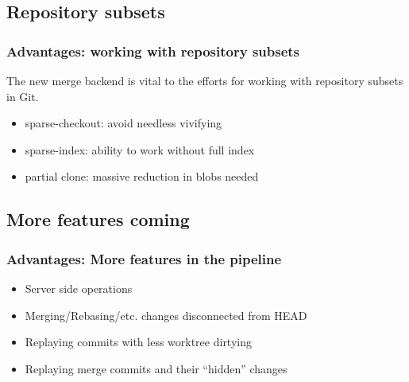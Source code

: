 \documentclass[compress,t]{beamer}
\begin{document}
\begin{frame}[fragile]
\begin{comment}
  Due to the new merge strategy, the fourth now has an answer too:
  \begin{enumerate}[4]
    \item \texttt{git diff AUTO\_MERGE}
  \end{enumerate}
  \end{comment}

\end{frame}

\subsection[subsetting]{Repository subsets}

\begin{frame}
  \frametitle{Advantages: working with repository subsets}

  The new merge backend is vital to the efforts for working with
  repository subsets in Git.
  \begin{itemize}
    \item sparse-checkout: avoid needless vivifying
    \item sparse-index: ability to work without full index
    \item partial clone: massive reduction in blobs needed
  \end{itemize}

\end{frame}

\subsection[...]{More features coming}

\begin{frame}
  \frametitle{Advantages: More features in the pipeline}

  \begin{itemize}
    \item Server side operations
    \item Merging/Rebasing/etc. changes disconnected from HEAD
    \item Replaying commits with less worktree dirtying
    \item Replaying merge commits and their ``hidden'' changes
  \end{itemize}

\end{frame}
\end{document}
